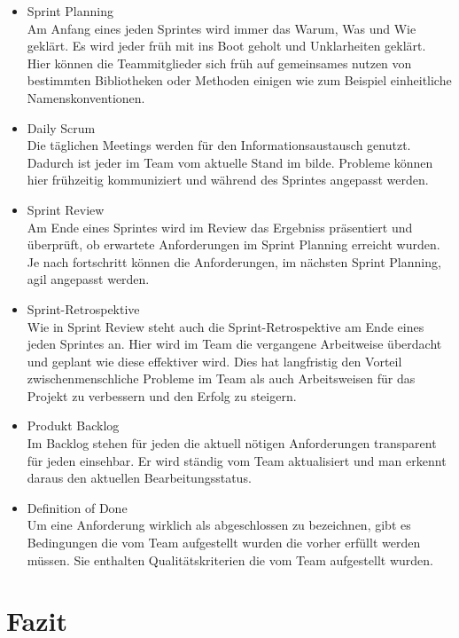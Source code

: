 \documentclass[a4paper, ngerman, 12pt, usenames, dvipsnames]{article}
\begin{document}
\begin{itemize}
    \item Sprint Planning\\
    Am Anfang eines jeden Sprintes wird immer das Warum, Was und Wie geklärt. 
    Es wird jeder früh mit ins Boot geholt und Unklarheiten geklärt.
    Hier können die Teammitglieder sich früh auf gemeinsames nutzen von bestimmten Bibliotheken oder Methoden einigen wie zum Beispiel einheitliche Namenskonventionen.
    \item Daily Scrum\\
    Die täglichen Meetings werden für den Informationsaustausch genutzt. 
    Dadurch ist jeder im Team vom aktuelle Stand im bilde. Probleme können hier frühzeitig kommuniziert und während des Sprintes angepasst werden.
    \item Sprint Review\\
    Am Ende eines Sprintes wird im Review das Ergebniss präsentiert und überprüft, ob erwartete Anforderungen im Sprint Planning erreicht wurden.
     Je nach fortschritt können die Anforderungen, im nächsten Sprint Planning, agil angepasst werden.
    \item Sprint-Retrospektive\\
    Wie in Sprint Review steht auch die Sprint-Retrospektive am Ende eines jeden Sprintes an. Hier wird im Team die vergangene Arbeitweise überdacht und geplant wie diese effektiver wird.
    Dies hat langfristig den Vorteil zwischenmenschliche Probleme im Team als auch Arbeitsweisen für das Projekt zu verbessern und den Erfolg zu steigern.
    \item Produkt Backlog\\
    Im Backlog stehen für jeden die aktuell nötigen Anforderungen transparent für jeden einsehbar. 
    Er wird ständig vom Team aktualisiert und man erkennt daraus den aktuellen Bearbeitungsstatus.
    \item Definition of Done\\
    Um eine Anforderung wirklich als abgeschlossen zu bezeichnen, gibt es Bedingungen die vom Team aufgestellt wurden die vorher erfüllt werden müssen.
    Sie enthalten Qualitätskriterien die vom Team aufgestellt wurden.
     
\end{itemize}
\section{Fazit}



\end{document}
